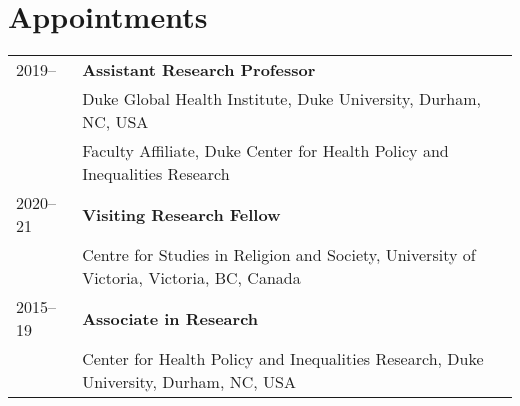 \vspace{3ex}
\section*{Appointments}
\begin{longtable}{p{} p{}}
2019-- & \textbf{Assistant Research Professor}\\
		             & Duke Global Health Institute, Duke University, Durham, NC, USA \\
		             & Faculty Affiliate, Duke Center for Health Policy and Inequalities Research\\
		             
2020--21 & \textbf{Visiting Research Fellow}\\
	& Centre for Studies in Religion and Society, University of Victoria, Victoria, BC, Canada \\
	2015--19 & \textbf{Associate in Research}\\
	& Center for Health Policy and Inequalities Research, Duke University, Durham, NC, USA \\
\end{longtable}

